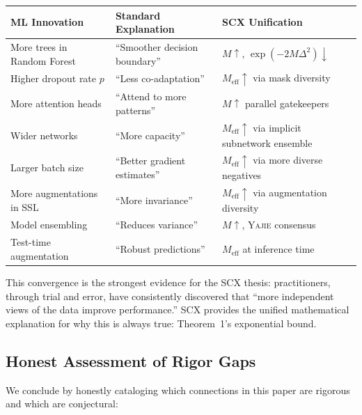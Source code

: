 \documentclass[12pt,a4paper]{article}
\theoremstyle{definition}
\newcommand{\Yajie}{\textsc{Yajie}}
\newcommand{\SCX}{\textsc{SCX}}
\begin{document}
\begin{center}
\begin{tabular}{@{}lll@{}}
\toprule
\textbf{ML Innovation} & \textbf{Standard Explanation} & \textbf{SCX Unification} \\
\midrule
More trees in Random Forest & ``Smoother decision boundary'' & $M \uparrow$, $\exp(-2M\Delta^2) \downarrow$ \\
Higher dropout rate $p$ & ``Less co-adaptation'' & $M_{\text{eff}} \uparrow$ via mask diversity \\
More attention heads & ``Attend to more patterns'' & $M \uparrow$ parallel gatekeepers \\
Wider networks & ``More capacity'' & $M_{\text{eff}} \uparrow$ via implicit subnetwork ensemble \\
Larger batch size & ``Better gradient estimates'' & $M_{\text{eff}} \uparrow$ via more diverse negatives \\
More augmentations in SSL & ``More invariance'' & $M_{\text{eff}} \uparrow$ via augmentation diversity \\
Model ensembling & ``Reduces variance'' & $M \uparrow$, \Yajie{} consensus \\
Test-time augmentation & ``Robust predictions'' & $M_{\text{eff}}$ at inference time \\
\bottomrule
\end{tabular}
\end{center}

This convergence is the strongest evidence for the \SCX{} thesis: practitioners, through trial and error, have consistently discovered that ``more independent views of the data improve performance.'' \SCX{} provides the unified mathematical explanation for why this is always true: Theorem~1's exponential bound.

\subsection{Honest Assessment of Rigor Gaps}

We conclude by honestly cataloging which connections in this paper are rigorous and which are conjectural:
\end{document}
